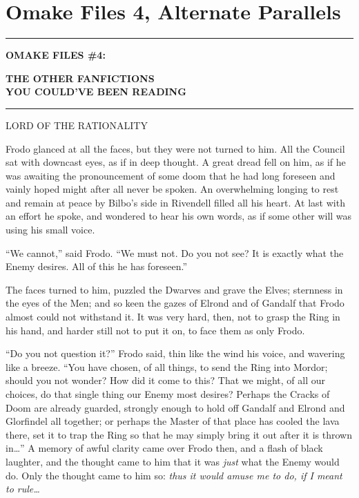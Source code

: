 \chapter{Omake Files 4, Alternate
Parallels}\label{omake-files-4-alternate-parallels}

\begin{center}\rule{3in}{0.4pt}\end{center}

\textbf{OMAKE FILES \#4:}

\textbf{THE OTHER FANFICTIONS}\\\textbf{YOU COULD'VE BEEN READING}

\begin{center}\rule{3in}{0.4pt}\end{center}

LORD OF THE RATIONALITY

Frodo glanced at all the faces, but they were not turned to him. All the
Council sat with downcast eyes, as if in deep thought. A great dread
fell on him, as if he was awaiting the pronouncement of some doom that
he had long foreseen and vainly hoped might after all never be spoken.
An overwhelming longing to rest and remain at peace by Bilbo's side in
Rivendell filled all his heart. At last with an effort he spoke, and
wondered to hear his own words, as if some other will was using his
small voice.

``We cannot,'' said Frodo. ``We must not. Do you not see? It is exactly
what the Enemy desires. All of this he has foreseen.''

The faces turned to him, puzzled the Dwarves and grave the Elves;
sternness in the eyes of the Men; and so keen the gazes of Elrond and of
Gandalf that Frodo almost could not withstand it. It was very hard,
then, not to grasp the Ring in his hand, and harder still not to put it
on, to face them as only Frodo.

``Do you not question it?'' Frodo said, thin like the wind his voice,
and wavering like a breeze. ``You have chosen, of all things, to send
the Ring into Mordor; should you not wonder? How did it come to this?
That we might, of all our choices, do that single thing our Enemy most
desires? Perhaps the Cracks of Doom are already guarded, strongly enough
to hold off Gandalf and Elrond and Glorfindel all together; or perhaps
the Master of that place has cooled the lava there, set it to trap the
Ring so that he may simply bring it out after it is thrown in\ldots{}''
A memory of awful clarity came over Frodo then, and a flash of black
laughter, and the thought came to him that it was \emph{just} what the
Enemy would do. Only the thought came to him so: \emph{thus it would
amuse me to do, if I meant to rule\ldots{}}

